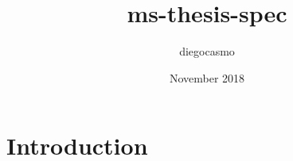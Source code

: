 \documentclass{article}
\title{ms-thesis-spec}
\author{diegocasmo }
\date{November 2018}
\begin{document}
\maketitle

\section{Introduction}
\end{document}
